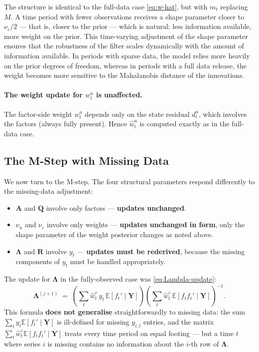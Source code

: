 \documentclass[11pt, a4paper, oneside]{article}
\newcommand{\mL}{\boldsymbol{\Lambda}}
\begin{document}
The structure is identical to the full-data case \eqref{eq:w-hat}, but
with $m_t$ replacing $M$. A time period with fewer observations
receives a shape parameter closer to $\nu_\varepsilon / 2$ — that is,
closer to the prior — which is natural: less information available,
more weight on the prior. This time-varying adjustment of the shape parameter ensures that the robustness of the filter scales dynamically with the amount of information available. In periods with sparse data, the model relies more heavily on the prior degrees of freedom, whereas in periods with a full data release, the weight becomes more sensitive to the Mahalanobis distance of the innovations.


\paragraph{The weight update for $w^u_t$ is unaffected.}
The factor-side weight $w^u_t$ depends only on the state residual
$d^u_t$, which involves the factors (always fully present). Hence
$\hat{w}^u_t$ is computed exactly as in the full-data case.

\subsection{The M-Step with Missing Data}
\label{subsec:m-step-missing}

We now turn to the M-step. The four structural parameters respond
differently to the missing-data adjustment:
\begin{itemize}[leftmargin=1.5em, itemsep=2pt]
    \item $\mathbf{A}$ and $\mathbf{Q}$ involve only factors — \textbf{updates
          unchanged}.
    \item $\nu_u$ and $\nu_\varepsilon$ involve only weights — \textbf{updates
          unchanged in form}, only the shape parameter of the weight
          posterior changes as noted above.
    \item $\mL$ and $\mathbf{R}$ involve $y_t$ — \textbf{updates
          must be rederived}, because the missing components of $y_t$
          must be handled appropriately.
\end{itemize}

The update for $\mL$ in the fully-observed case was
\eqref{eq:Lambda-update}:
\[
\mL^{(j+1)} \;=\; \left(\sum_t \hat{w}^\varepsilon_t\, y_t\, \mathbb{E}[f_t' \mid \mathbf{Y}]\right)\left(\sum_t \hat{w}^\varepsilon_t\, \mathbb{E}[f_t f_t' \mid \mathbf{Y}]\right)^{-1}.
\]
This formula \textbf{does not generalise} straightforwardly to missing
data: the sum $\sum_t y_t \mathbb{E}[f_t' \mid \mathbf{Y}]$ is ill-defined
for missing $y_{i,t}$ entries, and the matrix $\sum_t \hat{w}^\varepsilon_t \mathbb{E}[f_t f_t' \mid \mathbf{Y}]$ treats every time period on equal footing — but a time $t$ where series $i$ is missing contains no
information about the $i$-th row of $\mL$.
\end{document}
